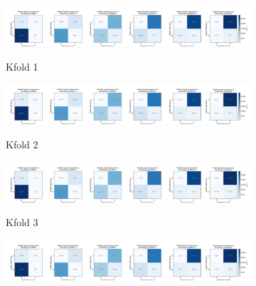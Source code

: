 \begin{figure}[!h]
    \centering
    \begin{subfigure}[b]{1\textwidth}
      \centering
      \includegraphics[width=1\textwidth]{./images/083_xgb_7_features_5fold_binary_confusion_matrices_per_binary_threshold_kfold0}\\
      \caption{Kfold 1}
      \label{fig:results_waterfall}
    \end{subfigure}
    \hfill
    \begin{subfigure}[b]{1\textwidth}
      \centering    
      \includegraphics[width=1\textwidth]{./images/083_xgb_7_features_5fold_binary_confusion_matrices_per_binary_threshold_kfold1}\\
      \caption{Kfold 2}
      \label{fig:results_waterfall}
    \end{subfigure}
    \hfill
    \begin{subfigure}[b]{1\textwidth}
      \centering
      \includegraphics[width=1\textwidth]{./images/083_xgb_7_features_5fold_binary_confusion_matrices_per_binary_threshold_kfold2}\\
      \caption{Kfold 3}
      \label{fig:results_waterfall}
    \end{subfigure}
    \hfill
    \begin{subfigure}[b]{1\textwidth}
      \centering
      \includegraphics[width=1\textwidth]{./images/083_xgb_7_features_5fold_binary_confusion_matrices_per_binary_threshold_kfold3}\\

\end{subfigure}
\end{figure}
